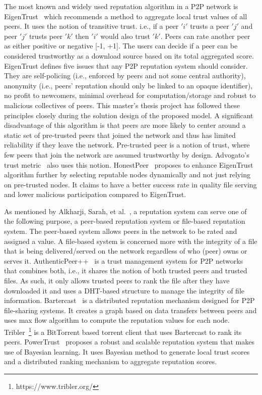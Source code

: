 The most known and widely used reputation algorithm in a P2P network is
EigenTrust~\cite{kamvar2003eigentrust} which recommends a method to aggregate
local trust values of all peers. It uses the notion of transitive trust. i.e.,
if a peer $'i'$ trusts a peer $'j'$ and peer $'j'$ trusts peer $'k'$ then $'i'$
would also trust $'k'$. Peers can rate another peer as either positive or
negative [-1, +1]. The users can decide if a peer can be considered trustworthy
as a download source based on its total aggregated score. EigenTrust defines
five issues that any P2P reputation system should consider. They are
self-policing (i.e., enforced by peers and not some central authority),
anonymity (i.e., peers' reputation should only be linked to an opaque
identifier), no profit to newcomers, minimal overhead for computation/storage
and robust to malicious collectives of peers. This master's thesis project has
followed these principles closely during the solution design of the proposed
model. A significant disadvantage of this algorithm is that peers are more
likely to center around a static set of pre-trusted peers that joined the
network and thus has limited reliability if they leave the network.
Pre-trusted peer is a notion of trust, where few peers that join the network are
assumed trustworthy by design. Advogato's trust
metric~\cite{levien2003advogato} also uses this notion.
HonestPeer~\cite{kurdi2015honestpeer} proposes to enhance EigenTrust algorithm
further by selecting reputable nodes dynamically and not just relying on
pre-trusted nodes. It claims to have a better success rate in quality file
serving and lower malicious participation compared to EigenTrust. \par
As mentioned by Alkharji, Sarah, et al.~\cite{alkharji2017authenticpeer++}, a
reputation system can serve one of the following purpose, a peer-based
reputation system or file-based reputation system. The peer-based system allows
peers in the network to be rated and assigned a value. A file-based system is
concerned more with the integrity of a file that is being delivered/served on
the network regardless of who (peer) owns or serves it.
AuthenticPeer++~\cite{alkharji2017authenticpeer++} is a trust management system
for P2P networks that combines both, i.e., it shares the notion of both trusted
peers and trusted files. As such, it only allows trusted peers to rank the file
after they have downloaded it and uses a DHT-based structure to manage the
integrity of file information. Bartercast~\cite{meulpolder2009bartercast} is a
distributed reputation mechanism designed for P2P file-sharing systems. It
creates a graph based on data transfers between peers and uses max flow
algorithm to compute the reputation values for each node.
Tribler~\footnote{https://www.tribler.org/} is a BitTorrent based torrent
client that uses Bartercast to rank its peers.
PowerTrust~\cite{zhou2007powertrust} proposes a robust and scalable reputation
system that makes use of Bayesian learning. It uses Bayesian method to generate
local trust scores and a distributed ranking mechanism to aggregate reputation
scores. 

